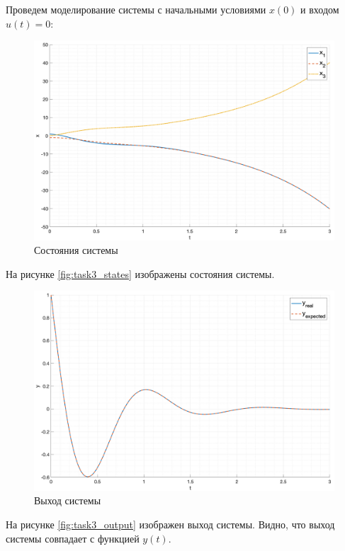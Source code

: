 Проведем моделирование системы с начальными условиями $x(0)$ и входом $u(t) = 0$: 
\begin{figure}
    \centering
    \includegraphics[width=\textwidth]{media/plots/task4_states.png}
    \caption{Состояния системы}
    \label{fig:task4_states}
\end{figure}
На рисунке \ref{fig:task3_states} изображены состояния системы.
\begin{figure}
    \centering
    \includegraphics[width=\textwidth]{media/plots/task4_output.png}
    \caption{Выход системы}
    \label{fig:task4_output}
\end{figure}
На рисунке \ref{fig:task3_output} изображен выход системы. Видно, что выход системы совпадает с функцией $y(t)$.
